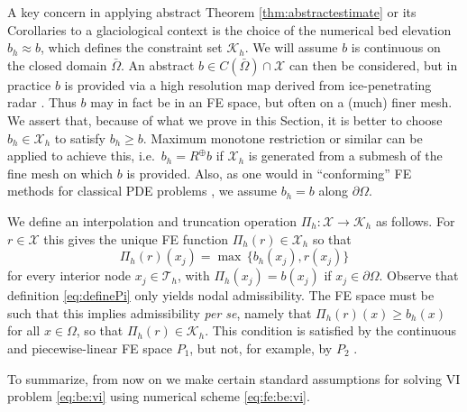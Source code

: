 \documentclass[hidelinks,onefignum,onetabnum,final]{siamart220329}  %
\newcommand{\cK}{\mathcal{K}}
\newcommand{\cT}{\mathcal{T}}
\newcommand{\cX}{\mathcal{X}}
\begin{document}
A key concern in applying abstract Theorem \ref{thm:abstractestimate} or its Corollaries to a glaciological context is the choice of the numerical bed elevation $b_h \approx b$, which defines the constraint set $\cK_h$.  We will assume $b$ is continuous on the closed domain $\bar\Omega$.  An abstract $b\in C(\bar\Omega) \cap \cX$ can then be considered, but in practice $b$ is provided via a high resolution map derived from ice-penetrating radar \cite{Morlighemetal2017}.  Thus $b$ may in fact be in an FE space, but often on a (much) finer mesh.  We assert that, because of what we prove in this Section, it is better to choose $b_h \in \cX_h$ to satisfy $b_h\ge b$.  Maximum monotone restriction \cite{BuelerFarrell2024} or similar can be applied to achieve this, i.e.~$b_h = R^\oplus b$ if $\cX_h$ is generated from a submesh of the fine mesh on which $b$ is provided.  Also, as one would in ``conforming'' FE methods for classical PDE problems \cite{Elmanetal2014}, we assume $b_h=b$ along $\partial\Omega$.

We define an interpolation and truncation operation $\Pi_h : \cX \to \cK_h$ as follows.  For $r\in\cX$ this gives the unique FE function $\Pi_h(r) \in \cX_h$ so that
\begin{equation}
\Pi_h(r)(x_j) = \max \,\{b_h(x_j), r(x_j)\} \label{eq:definePi}
\end{equation}
for every interior node $x_j \in \cT_h$, with $\Pi_h(x_j)=b(x_j)$ if $x_j\in\partial\Omega$.  Observe that definition \eqref{eq:definePi} only yields nodal admissibility.  The FE space must be such that this implies admissibility \emph{per se}, namely that $\Pi_h(r)(x) \ge b_h(x)$ for all $x \in \Omega$, so that $\Pi_h(r) \in \cK_h$.  This condition is satisfied by the continuous and piecewise-linear FE space $P_1$, but not, for example, by $P_2$ \cite{BuelerFarrell2024}.

To summarize, from now on we make certain standard assumptions for solving VI problem \eqref{eq:be:vi} using numerical scheme \eqref{eq:fe:be:vi}.
\end{document}
